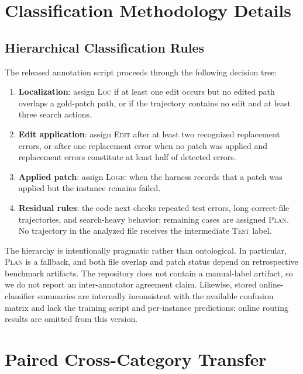 \documentclass{article}
\begin{document}
\section{Classification Methodology Details}
\label{app:classification}

\subsection{Hierarchical Classification Rules}

The released annotation script proceeds through the following decision tree:

\begin{enumerate}
\item \textbf{Localization}: assign \textsc{Loc} if at least one edit occurs
but no edited path overlaps a gold-patch path, or if the trajectory contains no
edit and at least three search actions.
\item \textbf{Edit application}: assign \textsc{Edit} after at least two
recognized replacement errors, or after one replacement error when no patch was
applied and replacement errors constitute at least half of detected errors.
\item \textbf{Applied patch}: assign \textsc{Logic} when the harness records
that a patch was applied but the instance remains failed.
\item \textbf{Residual rules}: the code next checks repeated test errors,
long correct-file trajectories, and search-heavy behavior; remaining cases are
assigned \textsc{Plan}.  No trajectory in the analyzed file receives the
intermediate \textsc{Test} label.
\end{enumerate}

The hierarchy is intentionally pragmatic rather than ontological.  In
particular, \textsc{Plan} is a fallback, and both file overlap and patch status
depend on retrospective benchmark artifacts.  The repository does not contain
a manual-label artifact, so we do not report an inter-annotator agreement claim.
Likewise, stored online-classifier summaries are internally inconsistent with
the available confusion matrix and lack the training script and per-instance
predictions; online routing results are omitted from this version.

\section{Paired Cross-Category Transfer}
\label{app:cross-type}
\end{document}
